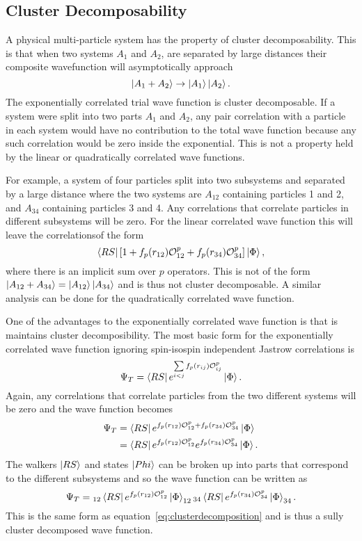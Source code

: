 \subsection{Cluster Decomposability}
A physical multi-particle system has the property of cluster decomposability. This is that when two systems $A_1$ and $A_2$, are separated by large distances their composite wavefunction will asymptotically approach
\begin{equation}
   \left| A_1 + A_2 \right> \rightarrow \left| A_1 \right>\left| A_2 \right>.
   \label{eq:clusterdecomposition}
\end{equation}
The exponentially correlated trial wave function is cluster decomposable. If a system were split into two parts $A_1$ and $A_2$, any pair correlation with a particle in each system would have no contribution to the total wave function because any such correlation would be zero inside the exponential. This is not a property held by the linear or quadratically correlated wave functions.

For example, a system of four particles split into two subsystems and separated by a large distance where the two systems are $A_{12}$ containing particles 1 and 2, and $A_{34}$ containing particles 3 and 4. Any correlations that correlate particles in different subsystems will be zero. For the linear correlated wave function this will leave the correlationsof the form
\begin{equation}
   \left< RS \right|\left[1+f_p(r_{12})\mathcal{O}^p_{12}+f_p(r_{34})\mathcal{O}^p_{34}\right]\left| \Phi \right>,
\end{equation}
where there is an implicit sum over $p$ operators. This is not of the form $\left| A_{12} + A_{34} \right> = \left| A_{12} \right>\left| A_{34} \right>$ and is thus not cluster decomposable. A similar analysis can be done for the quadratically correlated wave function.

One of the advantages to the exponentially correlated wave function is that is maintains cluster decomposibility. The most basic form for the exponentially correlated wave function ignoring spin-isospin independent Jastrow correlations is
\begin{equation}
   \Psi_T = \left< RS \right| e^{\sum\limits_{i<j} f_p(r_{ij})\mathcal{O}^p_{ij}} \left| \Phi \right>.
\end{equation}
Again, any correlations that correlate particles from the two different systems will be zero and the wave function becomes
\begin{align}
   \Psi_T &= \left< RS \right| e^{f_p(r_{12})\mathcal{O}^p_{12} + f_p(r_{34})\mathcal{O}^p_{34}} \left| \Phi \right> \\
   &= \left< RS \right| e^{f_p(r_{12})\mathcal{O}^p_{12}} e^{f_p(r_{34})\mathcal{O}^p_{34}} \left| \Phi \right>.
\end{align}
The walkers $\left| RS \right>$ and states $\left| Phi \right>$ can be broken up into parts that correspond to the different subsystems and so the wave function can be written as
\begin{equation}
   \Psi_T = {}_{12}\left< RS \right|e^{f_p(r_{12})\mathcal{O}^p_{12}}\left| \Phi \right>_{12} {}_{34}\left< RS \right|e^{f_p(r_{34})\mathcal{O}^p_{34}}\left| \Phi \right>_{34}.
\end{equation}
This is the same form as equation~\ref{eq:clusterdecomposition} and is thus a sully cluster decomposed wave function.

